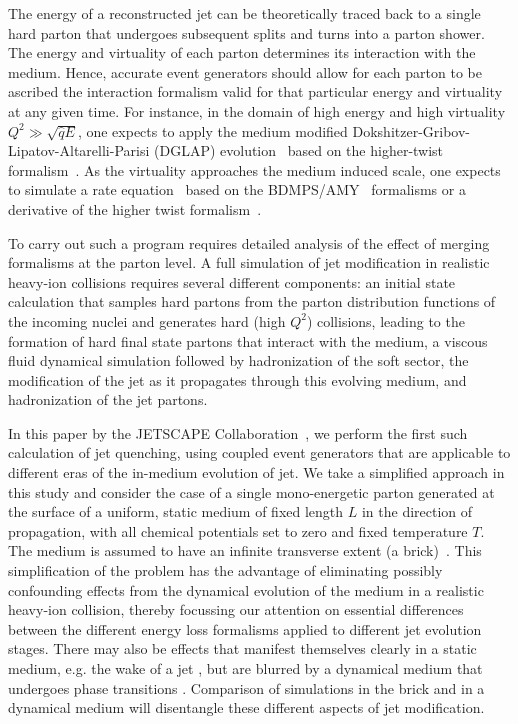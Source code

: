 \documentclass[aps,prc,twocolumn,floatfix,superscriptaddress,nofootinbib]{revtex4}
\begin{document}
The energy of a reconstructed jet can be theoretically traced back to a single hard parton that undergoes subsequent splits and turns into a parton shower. The energy and virtuality of each parton determines its interaction with the medium. Hence, accurate event generators should allow for each parton to be ascribed the interaction formalism valid for that particular energy and virtuality at any given time. For instance, in the domain of high energy and high virtuality $Q^2 \gg \sqrt{ \hat{q} E}$, one expects to apply the medium modified Dokshitzer-Gribov-Lipatov-Altarelli-Parisi (DGLAP) evolution~\cite{Majumder:2009zu,Wang:2009qb} based on the higher-twist formalism~\cite{Wang:2001ifa,Majumder:2009ge}. As the virtuality approaches the medium induced scale, one expects to simulate a rate equation~\cite{Jeon:2003gi,Turbide:2005fk,Qin:2009bk} based on the 
BDMPS/AMY~\cite{Baier:1996sk,Baier:1996kr,Arnold:2001ms,Arnold:2002ja} formalisms or a derivative of the higher twist formalism~\cite{Wang:2013cia,Cao:2016gvr,Cao:2017hhk,Chen:2017zte}.

To carry out such a program requires detailed analysis of the effect of merging formalisms at the parton level. A full simulation of jet modification in realistic heavy-ion collisions requires several different components: an initial state calculation that samples hard partons from the parton distribution functions of the incoming nuclei and generates hard (high $Q^2$) collisions, leading to the formation of hard final state partons that interact with the medium, a viscous fluid dynamical simulation followed by hadronization of the soft sector, the modification of the jet as it propagates through this evolving medium, and hadronization of the jet partons. 

In this paper by the JETSCAPE Collaboration~\cite{JETSCAPE_website}, we perform the first such calculation of jet quenching, using coupled event generators that are applicable to different eras of the in-medium evolution of jet. We take a simplified approach in this study and consider the case of a single mono-energetic parton generated at the surface of a uniform, static medium of fixed length $L$ in the direction of propagation, with all chemical potentials set to zero and fixed temperature $T$. 
The medium is assumed to have an infinite transverse extent (a brick)~\cite{Armesto:2011ht}. This simplification of the problem has the advantage of eliminating possibly confounding effects from the dynamical evolution of the medium in a realistic heavy-ion collision, thereby focussing our attention on essential differences between the different energy loss formalisms applied to different jet evolution stages. There may also be effects that manifest themselves clearly in a static medium, e.g. the wake of a jet \cite{Neufeld:2009ep,Qin:2009uh}, but are blurred by a dynamical medium that undergoes phase transitions \cite{He:2015pra}. Comparison of simulations in the brick and in a dynamical medium will disentangle these different aspects of jet modification. 
\end{document}
